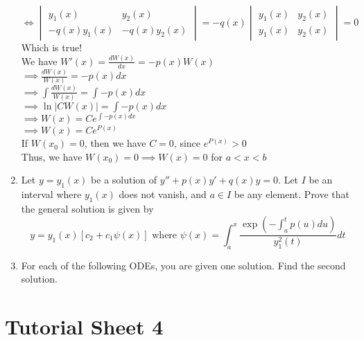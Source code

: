 \documentclass[a4paper]{article}
\begin{document}
\begin{enumerate}
	$\iff 
	\begin{vmatrix}
	y_1(x) & y_2(x)\\
	-q(x)y_1(x) & -q(x)y_2(x)
	\end{vmatrix}=-q(x)
	\begin{vmatrix}
	y_1(x) & y_2(x)\\
	y_1(x) & y_2(x)
	\end{vmatrix}
	=0$\\ \linebreak
	Which is true!\\
	We have $W'(x)=\frac{dW(x)}{dx}=-p(x)W(x)$\\
	$\implies \frac{dW(x)}{W(x)}=-p(x)dx$\\
	$\implies \int\frac{dW(x)}{W(x)}=\int -p(x)dx$\\
	$\implies \ln|CW(x)|=\int -p(x)dx$\\
	$\implies W(x)=Ce^{\int -p(x)dx}$\\
	$\implies W(x)=Ce^{P(x)}$\\
	If $W(x_0)=0$, then we have $C=0$, since $e^{P(x)}>0$\\
	Thus, we have $W(x_0)=0 \implies W(x)=0$ for $a<x<b$
	
	\item Let $y=y_1(x)$ be a solution of $y''+p(x)y'+q(x)y=0$. Let $I$ be an interval where $y_1(x)$ does not vanish, and $a\in I$ be any element. Prove that the general solution is given by \[y=y_1(x)[c_2+c_1\psi(x)] \text{ where } \psi(x)=\int_a^x\frac{\exp(-\int_a^tp(u)du)}{y_1^2(t)}dt \]

	\item For each of the following ODEs, you are given one solution. Find the second solution.
	
\end{enumerate}

\section{Tutorial Sheet 4}
\end{document}
